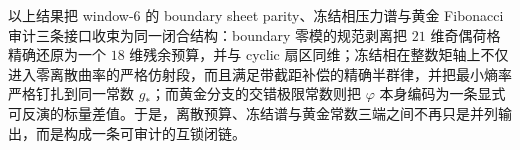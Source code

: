 \noindent
以上结果把 window-\(6\) 的 boundary sheet parity、冻结相压力谱与黄金 Fibonacci 审计三条接口收束为同一闭合结构：boundary 零模的规范剥离把 \(21\) 维奇偶荷格精确还原为一个 \(18\) 维残余预算，并与 cyclic 扇区同维；冻结相在整数矩轴上不仅进入零离散曲率的严格仿射段，而且满足带截距补偿的精确半群律，并把最小熵率严格钉扎到同一常数 \(g_*\)；而黄金分支的交错极限常数则把 \(\varphi\) 本身编码为一条显式可反演的标量差值。于是，离散预算、冻结谱与黄金常数三端之间不再只是并列输出，而是构成一条可审计的互锁闭链。

\endinput
